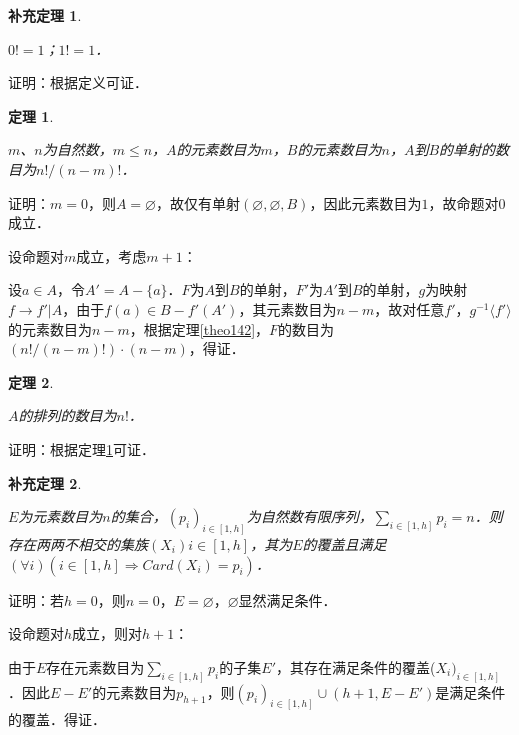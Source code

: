 \documentclass[12pt, a4paper, oneside]{book}
\newtheorem{theo}{定理}
\newtheorem{cor}{补充定理}
\begin{document}
			\begin{cor}\label{cor321}
				\hfill\par
				$0!=1$；$1!=1$．
			\end{cor}
			证明：根据定义可证．
			
			\begin{theo}\label{theo143}
				\hfill\par
				$m$、$n$为自然数，$m\leq n$，$A$的元素数目为$m$，$B$的元素数目为$n$，$A$到$B$的单射的数目为$n!/(n-m)!$．
			\end{theo}
			证明：$m=0$，则$A=\varnothing$，故仅有单射$(\varnothing, \varnothing, B)$，因此元素数目为$1$，故命题对$0$成立．
			\par
			设命题对$m$成立，考虑$m+1$：
			\par
			设$a\in A$，令$A'=A-\{a\}$．$F$为$A$到$B$的单射，$F'$为$A'$到$B$的单射，$g$为映射$f\to f'|A$，由于$f(a)\in B-f'(A')$，其元素数目为$n-m$，故对任意$f'$，$g^{-1}\langle f'\rangle$的元素数目为$n-m$，根据定理\ref{theo142}，$F$的数目为$(n!/(n-m)!)\cdot (n-m)$，得证．
			
			\begin{theo}\label{theo144}
				\hfill\par
				$A$的排列的数目为$n!$．
			\end{theo}
			证明：根据定理\ref{theo143}可证．
			
			\begin{cor}\label{cor322}
				\hfill\par
				$E$为元素数目为$n$的集合，$(p_i)_{i\in [1, h]}$为自然数有限序列，$\sum\limits_{i\in [1, h]}p_i=n$．则存在两两不相交的集族$(X_i)i\in[1, h]$，其为$E$的覆盖且满足$(\forall i)(i\in [1, h]\Rightarrow Card(X_i)=p_i)$．
			\end{cor}
			证明：若$h=0$，则$n=0$，$E=\varnothing$，$\varnothing$显然满足条件．
			\par
			设命题对$h$成立，则对$h+1$：
			\par
			由于$E$存在元素数目为$\sum\limits_{i\in [1, h]}p_i$的子集$E'$，其存在满足条件的覆盖($X_i)_{i\in [1, h]}$．因此$E-E'$的元素数目为$p_{h+1}$，则$(p_i)_{i\in [1, h]}\cup(h+1, E-E')$是满足条件的覆盖．得证．
			
\end{document}
